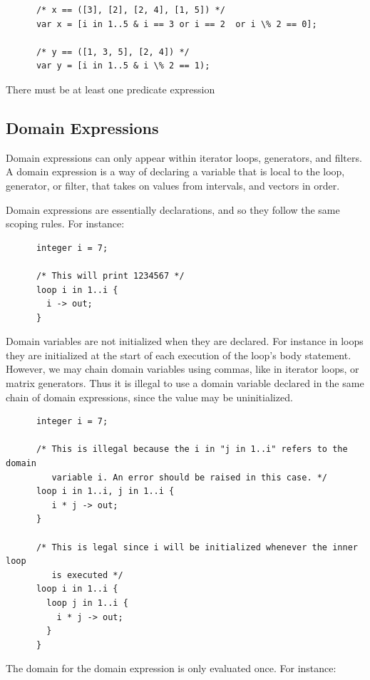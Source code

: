 \documentclass{article}
\begin{document}
    \begin{lstlisting}
      /* x == ([3], [2], [2, 4], [1, 5]) */
      var x = [i in 1..5 & i == 3 or i == 2  or i \% 2 == 0];

      /* y == ([1, 3, 5], [2, 4]) */
      var y = [i in 1..5 & i \% 2 == 1);
    \end{lstlisting}

    There must be at least one predicate expression

  \subsection{Domain Expressions}
    Domain expressions can only appear within iterator loops, generators, and filters. A domain expression is a way
    of declaring a variable that is local to the loop, generator, or filter, that takes on values from intervals,
    and vectors in order.

    Domain expressions are essentially declarations, and so they follow the same scoping rules. For instance:

    \begin{lstlisting}
      integer i = 7;

      /* This will print 1234567 */
      loop i in 1..i {
        i -> out;
      }
    \end{lstlisting}

    Domain variables are not initialized when they are declared. For instance in loops they are initialized at the
    start of each execution of the loop's body statement. However, we may chain domain variables using commas, like
    in iterator loops, or matrix generators. Thus it is illegal to use a domain variable declared in the same chain
    of domain expressions, since the value may be uninitialized.

    \begin{lstlisting}
      integer i = 7;

      /* This is illegal because the i in "j in 1..i" refers to the domain
         variable i. An error should be raised in this case. */
      loop i in 1..i, j in 1..i {
         i * j -> out;
      }

      /* This is legal since i will be initialized whenever the inner loop
         is executed */
      loop i in 1..i {
        loop j in 1..i {
          i * j -> out;
        }
      }
    \end{lstlisting}

    The domain for the domain expression is only evaluated once. For instance:
\end{document}
